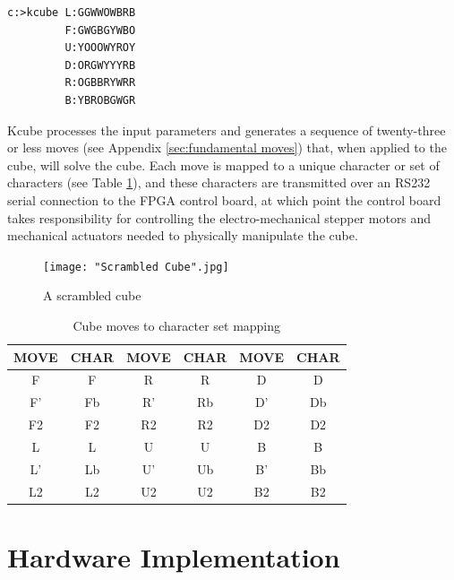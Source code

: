 \documentclass[final, letterpaper, 10 pt, conference, twocolumn]{IEEEtran}
\begin{document}
\begin{lstlisting}[style=DOS]
c:>kcube L:GGWWOWBRB
         F:GWGBGYWBO
         U:YOOOWYROY
         D:ORGWYYYRB
         R:OGBBRYWRR
         B:YBROBGWGR
\end{lstlisting}

Kcube processes the input parameters and generates a sequence of twenty-three or less moves (see Appendix \ref{sec:fundamental moves}) that, when applied to the cube, will solve the cube. Each move is mapped to a unique character or set of characters (see Table \ref{table:moves table}), and these characters are transmitted over an RS232 serial connection to the FPGA control board, at which point the control board takes responsibility for controlling the electro-mechanical stepper motors and mechanical actuators needed to physically manipulate the cube.


\begin{figure}[!hb]
\centering
\texttt{[image: "Scrambled Cube".jpg]}
\caption{A scrambled cube}
\label{fig:scrambled cube}
\end{figure}

\begin{table}[!ht]
\caption{Cube moves to character set mapping}
\label{table:moves table}
\centering
\begin{tabular}{|c|c|c|c|c|c|}
\hline
\textbf{MOVE} & \textbf{CHAR} & \textbf{MOVE} & \textbf{CHAR} & \textbf{MOVE} & \textbf{CHAR} \\ \hline
F             & F              & R             & R              & D             & D             \\ \hline
F'            & Fb              & R'            & Rb              & D'            & Db            \\ \hline
F2            & F2              & R2            & R2              & D2            & D2             \\ \hline
L             & L              & U             & U             & B             & B             \\ \hline
L'            & Lb              & U'            & Ub             & B'            & Bb             \\ \hline
L2            & L2              & U2            & U2             & B2            & B2             \\ \hline
\end{tabular}
\end{table}

\section{Hardware Implementation}
\end{document}
